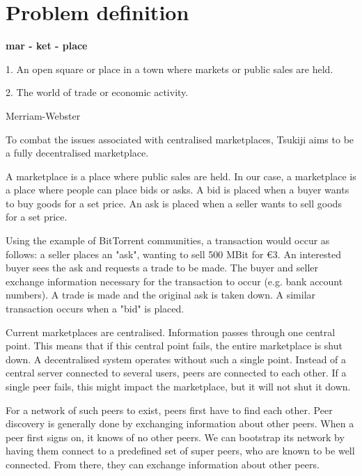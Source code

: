 \section{Problem definition}
\epigraph{\textbf{mar - ket - place}

1. An open square or place in a town where markets or public sales are held.

2. The world of trade or economic activity.}{Merriam-Webster}

To combat the issues associated with centralised marketplaces, Tsukiji aims to be a fully decentralised marketplace.

A marketplace is a place where public sales are held.
In our case, a marketplace is a place where people can place bids or asks.
A bid is placed when a buyer wants to buy goods for a set price.
An ask is placed when a seller wants to sell goods for a set price.

Using the example of BitTorrent communities, a transaction would occur as follows: a seller places an "ask", wanting to sell 500 MBit for €3.
An interested buyer sees the ask and requests a trade to be made.
The buyer and seller exchange information necessary for the transaction to occur (e.g. bank account numbers).
A trade is made and the original ask is taken down.
A similar transaction occurs when a "bid" is placed.

Current marketplaces are centralised.
Information passes through one central point.
This means that if this central point fails, the entire marketplace is shut down.
A decentralised system operates without such a single point.
Instead of a central server connected to several users, peers are connected to each other.
If a single peer fails, this might impact the marketplace, but it will not shut it down.

For a network of such peers to exist, peers first have to find each other.
Peer discovery is generally done by exchanging information about other peers.
When a peer first signs on, it knows of no other peers.
We can bootstrap its network by having them connect to a predefined set of super peers, who are known to be well connected.
From there, they can exchange information about other peers.